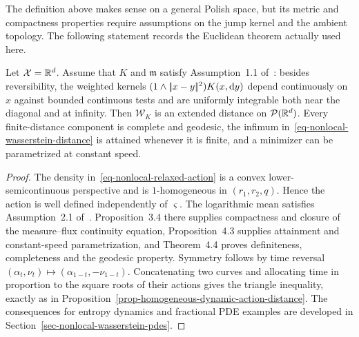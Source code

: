The definition above makes sense on a general Polish space, but its metric and compactness properties require assumptions on the jump kernel and the ambient topology. The following statement records the Euclidean theorem actually used here.
\begin{prop}\label{prop-nonlocal-distance-properties}
	Let $\mathcal X=\mathbb{R}^d$. Assume that $K$ and $\mathfrak m$ satisfy Assumption~1.1 of~\cite{Erbar2012JumpEntropy}: besides reversibility, the weighted kernels $(1\wedge|\!| x-y |\!|^2)K(x,\mathrm{d} y)$ depend continuously on $x$ against bounded continuous tests and are uniformly integrable both near the diagonal and at infinity. Then $\mathcal W_K$ is an extended distance on $\mathcal{P}(\mathbb{R}^d)$. Every finite-distance component is complete and geodesic, the infimum in~\eqref{eq-nonlocal-wasserstein-distance} is attained whenever it is finite, and a minimizer can be parametrized at constant speed.
\end{prop}
\begin{proof}
	The density in~\eqref{eq-nonlocal-relaxed-action} is a convex lower-semicontinuous perspective and is $1$-homogeneous in $(r_1,r_2,q)$. Hence the action is well defined independently of $\varsigma$. The logarithmic mean satisfies Assumption~2.1 of~\cite{Erbar2012JumpEntropy}. Proposition~3.4 there supplies compactness and closure of the measure--flux continuity equation, Proposition~4.3 supplies attainment and constant-speed parametrization, and Theorem~4.4 proves definiteness, completeness and the geodesic property. Symmetry follows by time reversal $(\alpha_t,\nu_t)\mapsto(\alpha_{1-t},-\nu_{1-t})$. Concatenating two curves and allocating time in proportion to the square roots of their actions gives the triangle inequality, exactly as in Proposition~\ref{prop-homogeneous-dynamic-action-distance}. The consequences for entropy dynamics and fractional PDE examples are developed in Section~\ref{sec-nonlocal-wasserstein-pdes}.
\end{proof}

